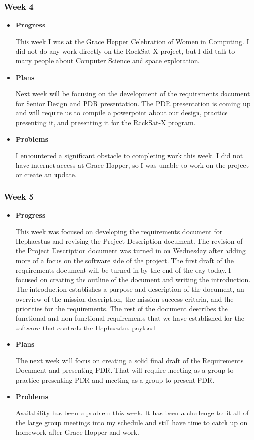\subsubsection{Week 4}
\begin{itemize}
\item{
\textbf{Progress}

This week I was at the Grace Hopper Celebration of Women in Computing. I did not do any work directly on the RockSat-X project, but I did talk to many people about Computer Science and space exploration.
}
\item{
\textbf{Plans}

Next week will be focusing on the development of the requirements document for Senior Design and PDR presentation. The PDR presentation is coming up and will require us to compile a powerpoint about our design, practice presenting it, and presenting it for the RockSat-X program.
}
\item{
\textbf{Problems}

I encountered a significant obstacle to completing work this week. I did not have internet access at Grace Hopper, so I was unable to work on the project or create an update.
}
\end{itemize}

\subsubsection{Week 5}
\begin{itemize}
\item{
\textbf{Progress}

This week was focused on developing the requirements document for Hephaestus and revising the Project Description document. The revision of the Project Description document was turned in on Wednesday after adding more of a focus on the software side of the project. The first draft of the requirements document will be turned in by the end of the day today. I focused on creating the outline of the document and writing the introduction. The introduction establishes a purpose and description of the document, an overview of the mission description, the mission success criteria, and the priorities for the requirements. The rest of the document describes the functional and non functional requirements that we have established for the software that controls the Hephaestus \gls{payload}.
}
\item{
\textbf{Plans}

The next week will focus on creating a solid final draft of the Requirements Document and presenting PDR. That will require meeting as a group to practice presenting PDR and meeting as a group to present PDR.
}
\item{
\textbf{Problems}

Availability has been a problem this week. It has been a challenge to fit all of the large group meetings into my schedule and still have time to catch up on homework after Grace Hopper and work.
}
\end{itemize}

